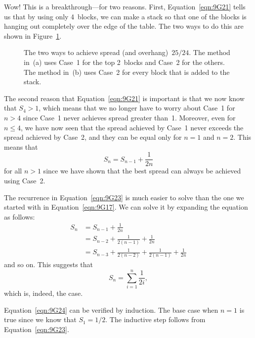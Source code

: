 Wow!  This is a breakthrough---for two reasons.  First,
Equation~\ref{eqn:9G21} tells us that by using only 4~blocks, we can
make a stack so that one of the blocks is hanging out completely over
the edge of the table.  The two ways to do this are shown in
Figure~\ref{fig:9G22}.

\begin{figure}

\qquad
{}

\caption{The two ways to achieve spread (and overhang)~$25/24$.  The
  method in~(a) uses Case~1 for the top 2~blocks and Case~2 for the
  others.  The method in~(b) uses Case~2 for every block that is added
to the stack.}

\label{fig:9G22}

\end{figure}

The second reason that Equation~\ref{eqn:9G21} is important is that we
now know that $S_4 > 1$, which means that we no longer have to worry
about Case~1 for $n > 4$ since Case~1 never achieves spread greater
than~1.  Moreover, even for~$n \le 4$, we have now seen that the
spread achieved by Case~1 never exceeds the spread achieved by Case~2,
and they can be equal only for $n = 1$ and $n = 2$.  This means that
\begin{equation}\label{eqn:9G23}
    S_n = S_{n - 1} + \frac{1}{2n}
\end{equation}
for all $n > 1$ since we have shown that the best spread can always be
achieved using Case~2.

The recurrence in Equation~\ref{eqn:9G23} is much easier to solve than
the one we started with in Equation~\ref{eqn:9G17}.  We can solve it
by expanding the equation as follows:
\begin{align*}
S_n &= S_{n - 1} + \frac{1}{2n} \\
    &= S_{n - 2} + \frac{1}{2(n - 1)} + \frac{1}{2n} \\
    &= S_{n - 3} + \frac{1}{2(n - 2)} + \frac{1}{2(n - 1)} + \frac{1}{2n}
\end{align*}
and so on.  This suggests that
\begin{equation}\label{eqn:9G24}
    S_n = \sum_{i = 1}^n \frac{1}{2i},
\end{equation}
which is, indeed, the case.

Equation~\ref{eqn:9G24} can be verified by induction.  The base case
when $n = 1$ is true since we know that $S_1 = 1/2$.  The inductive
step follows from Equation~\ref{eqn:9G23}.

